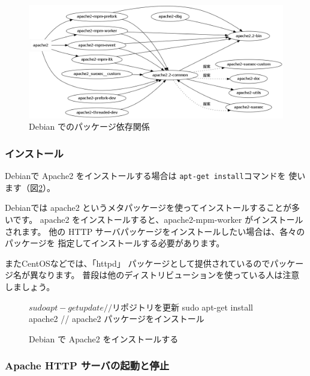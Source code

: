 \documentclass[mingoth,a4paper]{jsarticle}
\begin{document}
\begin{figure}[ht]
 \begin{center}
  \includegraphics[width=1.0\hsize]{image201203/apache2-pkg.png}
 \end{center}
\label{fig:apache-pkg-dep}\caption{Debian でのパッケージ依存関係}
\end{figure}

\subsubsection{インストール}

Debianで Apache2 をインストールする場合は \texttt{apt-get install}コマンドを
使います（図\ref{fig:install}）。

Debianでは apache2 というメタパッケージを使ってインストールすることが多いです。
apache2 をインストールすると、apache2-mpm-worker がインストールされます。
他の HTTP サーバパッケージをインストールしたい場合は、各々のパッケージを
指定してインストールする必要があります。

またCentOSなどでは、「httpd」 パッケージとして提供されているのでパッケージ名が異なります。
普段は他のディストリビューションを使っている人は注意しましょう。


\begin{figure}[ht]
 \begin{center}

\begin{commandline}
$ sudo apt-get update          // リポジトリを更新
$ sudo apt-get install apache2 // apache2 パッケージをインストール
\end{commandline}

 \end{center}
\label{fig:install}\caption{Debian で Apache2 をインストールする}
\end{figure}

\subsubsection{Apache HTTP サーバの起動と停止}
\end{document}
